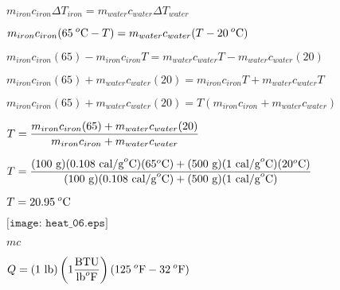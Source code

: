 \documentclass[12pt,a4paper,margin=2cm]{book}
\def\lthtmlcheckvsize{\ifdim\ht\sizebox<\vsize 
  \ifdim\wd\sizebox<\hsize\expandafter\hfill\fi \expandafter\vfill
  \else\expandafter\vss\fi}%
\begin{document}
{\newpage\clearpage
{}%
$\displaystyle m_{iron}c_{iron} \Delta T_{iron} = m_{water}c_{water} \Delta T_{water}$%
\lthtmlindisplaymathZ
\lthtmlcheckvsize\clearpage}

{\newpage\clearpage
{}%
$\displaystyle m_{iron}c_{iron} (65 \> ^o\hbox{C} - T) = m_{water}c_{water} (T - 20 \> ^o\hbox{C})$%
\lthtmlindisplaymathZ
\lthtmlcheckvsize\clearpage}

{\newpage\clearpage
{}%
$\displaystyle m_{iron}c_{iron}(65) - m_{iron}c_{iron}T = m_{water}c_{water}T - m_{water}c_{water}(20)$%
\lthtmlindisplaymathZ
\lthtmlcheckvsize\clearpage}

{\newpage\clearpage
{}%
$\displaystyle m_{iron}c_{iron}(65) + m_{water}c_{water}(20) = m_{iron}c_{iron}T + m_{water}c_{water}T $%
\lthtmlindisplaymathZ
\lthtmlcheckvsize\clearpage}

{\newpage\clearpage
{}%
$\displaystyle m_{iron}c_{iron}(65) + m_{water}c_{water}(20) = T(m_{iron}c_{iron} + m_{water}c_{water}) $%
\lthtmlindisplaymathZ
\lthtmlcheckvsize\clearpage}

{\newpage\clearpage
{}%
$\displaystyle T = {{m_{iron}c_{iron}(65) + m_{water}c_{water}(20)} \over {m_{iron}c_{iron} + m_{water}c_{water}}}$%
\lthtmlindisplaymathZ
\lthtmlcheckvsize\clearpage}

{\newpage\clearpage
{}%
$\displaystyle T = {{(100 \hbox{ g})(0.108 \hbox{ cal/g}^o\hbox{C})(65^o\hbox{C}) + (500 \hbox{ g})(1 \hbox{ cal/g}^o\hbox{C})(20^o\hbox{C})} \over {(100 \hbox{ g})(0.108 \hbox{ cal/g}^o\hbox{C}) + (500 \hbox{ g})(1 \hbox{ cal/g}^o\hbox{C})}}$%
\lthtmlindisplaymathZ
\lthtmlcheckvsize\clearpage}

{\newpage\clearpage
{}%
$\displaystyle T = 20.95 \> ^o\hbox{C}$%
\lthtmlindisplaymathZ
\lthtmlcheckvsize\clearpage}

{\newpage\clearpage
{}%
$\displaystyle \texttt{[image: heat\_06.eps]}$%
\lthtmlindisplaymathZ
\lthtmlcheckvsize\clearpage}

{\newpage\clearpage
{}%
$ mc$%
\lthtmlindisplaymathZ
\lthtmlcheckvsize\clearpage}

{\newpage\clearpage
{}%
$\displaystyle Q = (1 \hbox{ lb})\left(1 {\hbox{BTU} \over {\hbox{lb}^o\hbox{F}}}\right)(125 \> ^o\hbox{F} - 32 \> ^o\hbox{F})$%
\lthtmlindisplaymathZ
\lthtmlcheckvsize\clearpage}
\end{document}
